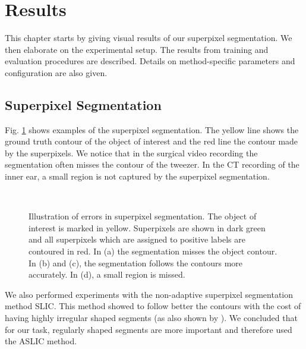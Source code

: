 \section{Results}
\label{sec:feats_results}
This chapter starts by giving visual results of our superpixel segmentation. We then elaborate on the experimental setup. The results from training and evaluation procedures are described. Details on method-specific parameters and configuration are also given.

\subsection{Superpixel Segmentation}
Fig. \ref{fig:sp_example} shows examples of the superpixel segmentation. The yellow line shows the ground truth contour of the object of interest and the red line the contour made by the superpixels. We notice that in the surgical video recording the segmentation often misses the contour of the tweezer. In the CT recording of the inner ear, a small region is not captured by the superpixel segmentation. 

\begin{figure}[htbp]
  \centering
  \hspace{2cm}
  \\
  \hspace{2cm}
  \caption[Superpixel segmentation example]{Illustration of errors in superpixel segmentation. The object of interest is marked in yellow. Superpixels are shown in dark green and all superpixels which are assigned to positive labels are contoured in red. In (a) the segmentation misses the object contour. In (b) and (c), the segmentation follows the contours more accurately. In (d), a small region is missed.}
  \label{fig:sp_example}
\end{figure}

We also performed experiments with the non-adaptive superpixel segmentation method SLIC.
This method showed to follow better the contours with the cost of having highly irregular shaped segments (as also shown by \cite{csillik16}).
We concluded that for our task, regularly shaped segments are more important and therefore used the ASLIC method.

